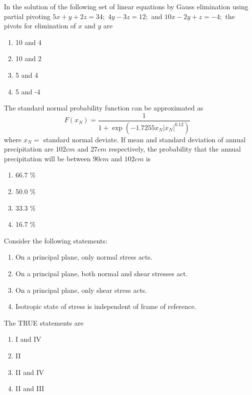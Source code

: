 \iffalse
    \title{Assignment}
    \author{EE24BTECH11009}
    \section{ce}
    \chapter{2009}
  \fi
\item In the solution of the following set of linear equations by Gauss elimination using partial pivoting
    $5x + y + 2z = 34;$ $4y - 3z = 12;$  and  $10x - 2y + z = -4;$
    the pivots for elimination of $x$ and $y$ are
\begin{enumerate}
    \item 10 and 4
    \item 10 and 2
    \item 5 and 4
    \item 5 and -4
\end{enumerate}
\item The standard normal probability function can be approximated as
$$F(x_N) = \frac{1}{1 + \exp(-1.7255 x_N |x_N|^{0.12})}$$
where $x_N =$ standard normal deviate. If mean and standard deviation of annual precipitation are $102 cm$ and $27 cm$ respectively, the probability that the annual precipitation will be between $90 cm$ and $102 cm$ is
\begin{enumerate}
    \item 66.7 \%
    \item 50.0 \%
    \item 33.3 \%
    \item 16.7 \%
\end{enumerate}
\item Consider the following statements:
\begin{enumerate}[label=\Roman{*}.]
    \item On a principal plane, only normal stress acts.
    \item On a principal plane, both normal and shear stresses act.
    \item On a principal plane, only shear stress acts.
    \item Isotropic state of stress is independent of frame of reference.
\end{enumerate}
The TRUE statements are
\begin{enumerate}
    \item I and IV
    \item II
    \item II and IV
    \item II and III
\end{enumerate}
